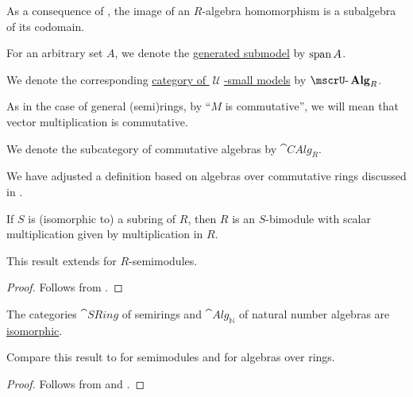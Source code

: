 \begin{definition}
\begin{thmenum}
    As a consequence of , the image of an \( R \)-algebra homomorphism is a subalgebra of its codomain.

     For an arbitrary set \( A \), we denote the \hyperref[def:first_order_generated_substructure]{generated submodel} by \( \operatorname{span}{ A } \).

     We denote the corresponding \hyperref[def:category_of_small_first_order_models]{category of \( \mscrU \)-small models} by \( \ucat{Alg}_R \).

     As in the case of general (semi)rings, by \enquote{\( M \) is commutative}, we will mean that vector multiplication is commutative.

    We denote the subcategory of commutative algebras by \( \cat{CAlg}_R \).
  \end{thmenum}
\end{definition}
\begin{comments}
  \item We have adjusted a definition based on algebras over commutative rings discussed in .
\end{comments}

\begin{proposition}\label{thm:algebra_over_subring}
  If \( S \) is (isomorphic to) a subring of \( R \), then \( R \) is an \( S \)-bimodule with scalar multiplication given by multiplication in \( R \).
\end{proposition}
\begin{comments}
  \item This result extends  for \( R \)-semimodules.
\end{comments}
\begin{proof}
  Follows from .
\end{proof}

\begin{corollary}\label{thm:semiring_is_natural_number_algebra}
  The categories \( \hyperref[def:semiring/category]{\cat{SRing}} \) of semirings and \( \hyperref[def:algebra_over_semiring/category]{\cat{Alg}_\BbbN} \) of natural number algebras are \hyperref[rem:category_similarity/isomorphism]{isomorphic}.
\end{corollary}
\begin{comments}
  \item Compare this result to  for semimodules and  for algebras over rings.
\end{comments}
\begin{proof}
  Follows from  and .
\end{proof}

